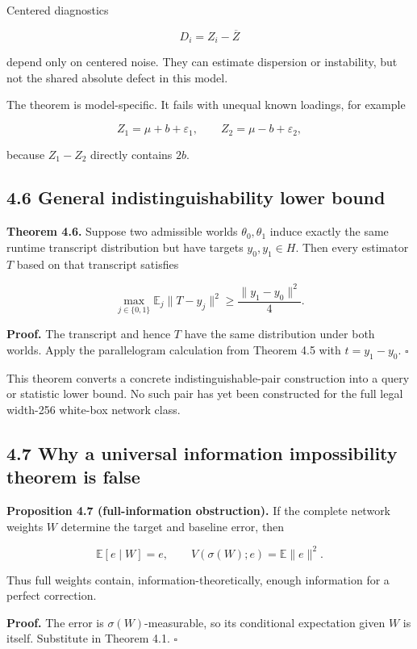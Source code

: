 \documentclass[
  10pt,
]{article}
\begin{document}
Centered diagnostics

\[
D_i=Z_i-\overline Z
\]

depend only on centered noise. They can estimate dispersion or
instability, but not the shared absolute defect in this model.

The theorem is model-specific. It fails with unequal known loadings, for
example

\[
Z_1=\mu+b+\varepsilon_1,
\qquad
Z_2=\mu-b+\varepsilon_2,
\]

because \(Z_1-Z_2\) directly contains \(2b\).

\subsection{4.6 General indistinguishability lower
bound}\label{general-indistinguishability-lower-bound}

\textbf{Theorem 4.6.} Suppose two admissible worlds
\(\theta_0,\theta_1\) induce exactly the same runtime transcript
distribution but have targets \(y_0,y_1\in H\). Then every estimator
\(T\) based on that transcript satisfies

\[
\max_{j\in\{0,1\}}
\mathbb E_j\|T-y_j\|^2
\ge
\frac{\|y_1-y_0\|^2}{4}.
\]

\textbf{Proof.} The transcript and hence \(T\) have the same
distribution under both worlds. Apply the parallelogram calculation from
Theorem 4.5 with \(t=y_1-y_0\). \(\square\)

This theorem converts a concrete indistinguishable-pair construction
into a query or statistic lower bound. No such pair has yet been
constructed for the full legal width-256 white-box network class.

\subsection{4.7 Why a universal information impossibility theorem is
false}\label{why-a-universal-information-impossibility-theorem-is-false}

\textbf{Proposition 4.7 (full-information obstruction).} If the complete
network weights \(W\) determine the target and baseline error, then

\[
\mathbb E[e\mid W]=e,
\qquad
V(\sigma(W);e)=\mathbb E\|e\|^2.
\]

Thus full weights contain, information-theoretically, enough information
for a perfect correction.

\textbf{Proof.} The error is \(\sigma(W)\)-measurable, so its
conditional expectation given \(W\) is itself. Substitute in Theorem
4.1. \(\square\)
\end{document}
